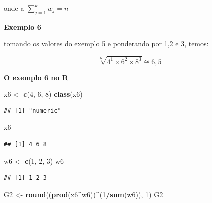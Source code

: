 \documentclass[
]{book}
\newenvironment{Shaded}{\begin{snugshade}}{\end{snugshade}}
\newcommand{\DecValTok}[1]{\textcolor[rgb]{0.00,0.00,0.81}{#1}}
\newcommand{\KeywordTok}[1]{\textcolor[rgb]{0.13,0.29,0.53}{\textbf{#1}}}
\newcommand{\NormalTok}[1]{#1}
\newcommand{\OperatorTok}[1]{\textcolor[rgb]{0.81,0.36,0.00}{\textbf{#1}}}
\newcommand{\StringTok}[1]{\textcolor[rgb]{0.31,0.60,0.02}{#1}}
\begin{document}
onde a \(\sum_{j=1}^{k} w_j = n\)

\textbf{Exemplo 6}

tomando os valores do exemplo 5 e ponderando por 1,2 e 3, temos:

\begin{equation*}
  \sqrt[6]{4^1 \times 6^2 \times 8^3} \cong 6,5
\end{equation*}

\textbf{O exemplo 6 no R}

\begin{Shaded}
\begin{Highlighting}[]
\NormalTok{x6 <-}\StringTok{ }\KeywordTok{c}\NormalTok{(}\DecValTok{4}\NormalTok{, }\DecValTok{6}\NormalTok{, }\DecValTok{8}\NormalTok{)}
\KeywordTok{class}\NormalTok{(x6)}
\end{Highlighting}
\end{Shaded}

\begin{verbatim}
## [1] "numeric"
\end{verbatim}

\begin{Shaded}
\begin{Highlighting}[]
\NormalTok{x6}
\end{Highlighting}
\end{Shaded}

\begin{verbatim}
## [1] 4 6 8
\end{verbatim}

\begin{Shaded}
\begin{Highlighting}[]
\NormalTok{w6 <-}\StringTok{ }\KeywordTok{c}\NormalTok{(}\DecValTok{1}\NormalTok{, }\DecValTok{2}\NormalTok{, }\DecValTok{3}\NormalTok{)}
\NormalTok{w6}
\end{Highlighting}
\end{Shaded}

\begin{verbatim}
## [1] 1 2 3
\end{verbatim}

\begin{Shaded}
\begin{Highlighting}[]
\NormalTok{G2 <-}\StringTok{ }\KeywordTok{round}\NormalTok{((}\KeywordTok{prod}\NormalTok{(x6}\OperatorTok{^}\NormalTok{w6))}\OperatorTok{^}\NormalTok{(}\DecValTok{1}\OperatorTok{/}\KeywordTok{sum}\NormalTok{(w6)), }\DecValTok{1}\NormalTok{)}
\NormalTok{G2}
\end{Highlighting}
\end{Shaded}
\end{document}
